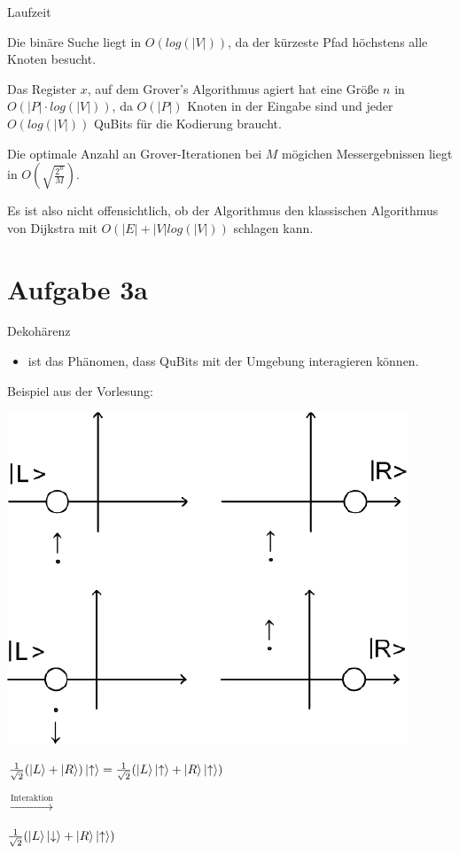 \documentclass[fleqn,compress,utf8,aspectratio=169,t]{beamer}
\begin{document}
\begin{frame}{Laufzeit}

Die binäre Suche liegt in $O(log(|V|))$, da der kürzeste Pfad höchstens alle Knoten besucht.

Das Register $x$, auf dem Grover's Algorithmus agiert hat eine Größe $n$ in $O(|P| \cdot log(|V|))$, da $O(|P|)$ Knoten in der Eingabe sind und jeder $O(log(|V|))$ QuBits für die Kodierung braucht.

Die optimale Anzahl an Grover-Iterationen bei $M$ mögichen Messergebnissen liegt in $O(\sqrt{\frac{2^{n}}{M}})$.

Es ist also nicht offensichtlich, ob der Algorithmus den klassischen Algorithmus von Dijkstra mit $O(|E| + |V| log(|V|))$ schlagen kann.
\end{frame}

\section{Aufgabe 3a}

\begin{frame}{Dekohärenz}
\begin{itemize}
	\item ist das Phänomen, dass QuBits mit der Umgebung interagieren können.
\end{itemize}

Beispiel aus der Vorlesung:

\begin{minipage}{.5\textwidth}
\centering
\includegraphics[width=.7\textwidth]{images/3a.png}
\end{minipage}%
\begin{minipage}{.5\textwidth}
\centering
$\frac{1}{\sqrt2}(\ket{L} + \ket{R}) \ket{\uparrow} = \frac{1}{\sqrt2}(\ket{L} \ket{\uparrow} + \ket{R} \ket{\uparrow})$

\vspace{1em}

$\xrightarrow{\text{Interaktion}}$

\vspace{1em}

$\frac{1}{\sqrt2}(\ket{L} \ket{\downarrow} + \ket{R} \ket{\uparrow})$
\end{minipage}%
\end{frame}
\end{document}

